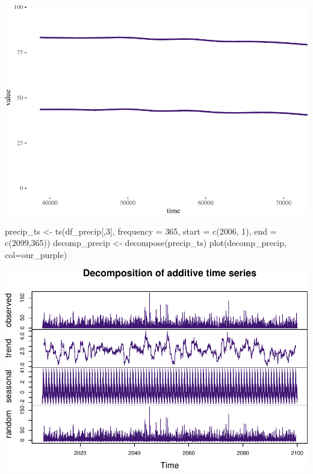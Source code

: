 \documentclass[
  paper=a4,
  ,captions=tableheading
]{scrartcl}
\newenvironment{Shaded}{\begin{snugshade}}{\end{snugshade}}
\newcommand{\AttributeTok}[1]{\textcolor[rgb]{0.77,0.63,0.00}{#1}}
\newcommand{\DecValTok}[1]{\textcolor[rgb]{0.00,0.00,0.81}{#1}}
\newcommand{\FunctionTok}[1]{\textcolor[rgb]{0.00,0.00,0.00}{#1}}
\newcommand{\NormalTok}[1]{#1}
\newcommand{\OtherTok}[1]{\textcolor[rgb]{0.56,0.35,0.01}{#1}}
\begin{document}
\includegraphics{Haskell_files/figure-latex/unnamed-chunk-78-1.pdf}

\begin{Shaded}
\begin{Highlighting}[]
\NormalTok{precip\_ts }\OtherTok{\textless{}{-}} \FunctionTok{ts}\NormalTok{(df\_precip[,}\DecValTok{3}\NormalTok{], }\AttributeTok{frequency =} \DecValTok{365}\NormalTok{, }\AttributeTok{start =} \FunctionTok{c}\NormalTok{(}\DecValTok{2006}\NormalTok{, }\DecValTok{1}\NormalTok{), }\AttributeTok{end =} \FunctionTok{c}\NormalTok{(}\DecValTok{2099}\NormalTok{,}\DecValTok{365}\NormalTok{))}
\NormalTok{decomp\_precip }\OtherTok{\textless{}{-}} \FunctionTok{decompose}\NormalTok{(precip\_ts)}
\FunctionTok{plot}\NormalTok{(decomp\_precip, }\AttributeTok{col=}\NormalTok{our\_purple)}
\end{Highlighting}
\end{Shaded}

\includegraphics{Haskell_files/figure-latex/unnamed-chunk-79-1.pdf}
\end{document}
